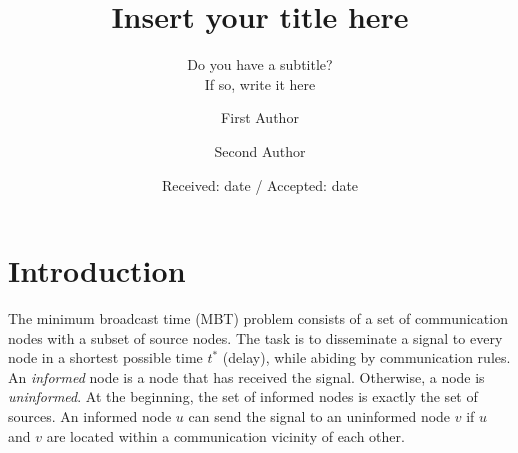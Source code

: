 \title{Insert your title here%
}
\subtitle{Do you have a subtitle?\\ If so, write it here}


\author{First Author         \and
        Second Author %
}



\date{Received: date / Accepted: date}


\maketitle

\begin{abstract}
\keywords{}
\end{abstract}

\section{Introduction}
\label{intro}
The minimum broadcast time (MBT) problem consists of a set of communication nodes with a subset of source nodes. 
The task is to disseminate a signal to every node in a shortest possible time $t^*$ (delay), while abiding by communication rules.
An \emph{informed} node is a node that has received the signal.
Otherwise, a node is \emph{uninformed}.
At the beginning, the set of informed nodes is exactly the set of sources.
An informed node $u$ can send the signal to an uninformed node $v$ if $u$ and $v$ are located within a communication vicinity of each other.

